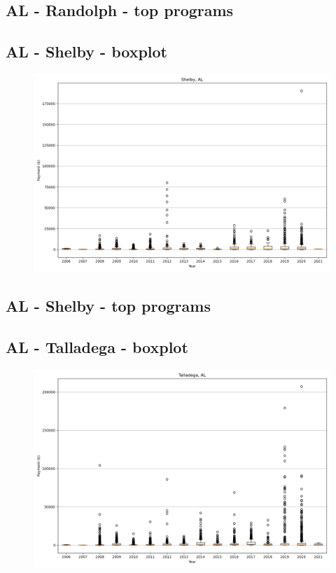 \subsection*{AL - Randolph - top programs}

\newpage
\subsection*{AL - Shelby - boxplot}
\begin{figure}[h]
\centering
\includegraphics[width=7in]{../output/boxplots/counties/Shelby-AL_boxplot.png}
\end{figure}


\subsection*{AL - Shelby - top programs}

\newpage
\subsection*{AL - Talladega - boxplot}
\begin{figure}[h]
\centering
\includegraphics[width=7in]{../output/boxplots/counties/Talladega-AL_boxplot.png}
\end{figure}


